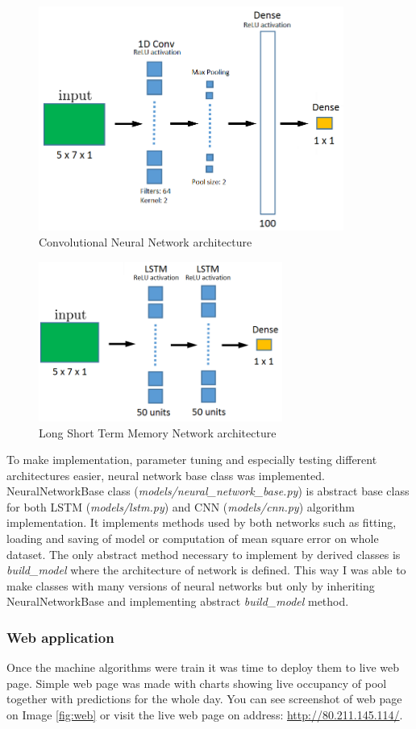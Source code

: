 \documentclass{article}
\begin{document}
\begin{figure}[h!]
\centering
\includegraphics[width=10cm]{imgs/cnn}
\caption{Convolutional Neural Network architecture}
\label{fig:cnn}
\end{figure}

\begin{figure}[h!]
\centering
\includegraphics[width=8cm]{imgs/lstm.png}
\caption{Long Short Term Memory Network architecture}
\label{fig:lstm}
\end{figure}

To make implementation, parameter tuning and especially testing different architectures easier, neural network base class was implemented. NeuralNetworkBase class (\emph{models/neural\_network\_base.py}) is abstract base class for both LSTM (\emph{models/lstm.py}) and CNN (\emph{models/cnn.py}) algorithm implementation. It implements methods used by both networks such as fitting, loading and saving of model or computation of mean square error on whole dataset. The only abstract method necessary to implement by derived classes is \emph{build\_model} where the architecture of network is defined. This way I was able to make classes with many versions of neural networks but only by inheriting NeuralNetworkBase and implementing abstract \emph{build\_model} method.

\subsubsection{Web application}
Once the machine algorithms were train it was time to deploy them to live web page. Simple web page was made with charts showing live occupancy of pool together with predictions for the whole day. You can see screenshot of web page on Image \ref{fig:web} or visit the live web page on address: \href{http://80.211.145.114/}{http://80.211.145.114/}.
\end{document}
